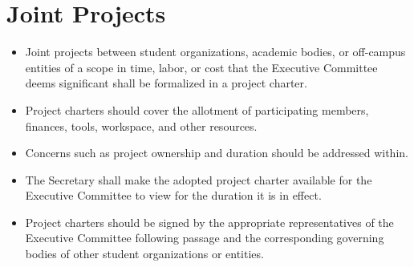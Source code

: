 \documentclass[12pt]{constitution}
\begin{document}
\section{Joint Projects}
\label{sec:tech_joint}
\begin{itemize}
    \item Joint projects between student organizations, academic bodies, or off-campus entities of a scope in time, labor, or cost that the Executive Committee deems significant shall be formalized in a project charter.
    \item Project charters should cover the allotment of participating members, finances, tools, workspace, and other resources.
    \item Concerns such as project ownership and duration should be addressed within.
    \item The Secretary shall make the adopted project charter available for the Executive Committee to view for the duration it is in effect.
    \item Project charters should be signed by the appropriate representatives of the Executive Committee following passage and the corresponding governing bodies of other student organizations or entities.
\end{itemize}
\end{document}
